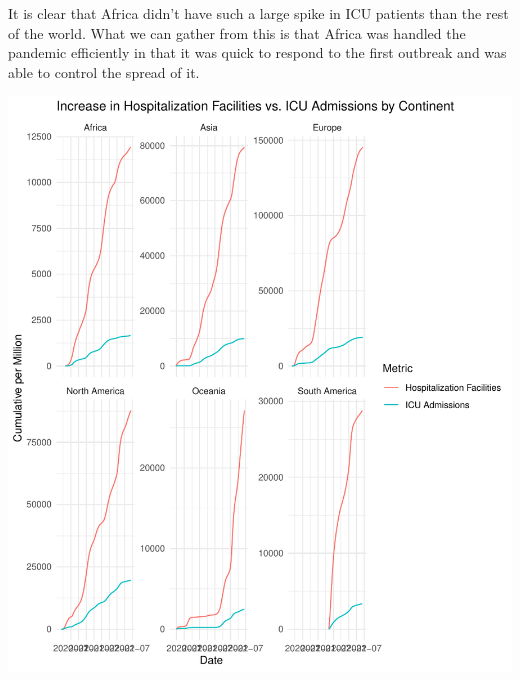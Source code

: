 \documentclass[12pt,preprint, authoryear]{elsarticle}
\let\origfigure\figure
\let\endorigfigure\endfigure
\renewenvironment{figure}[1][2] {
    \expandafter\origfigure\expandafter[H]
} {
    \endorigfigure
}
\numberwithin{equation}{section}
\numberwithin{figure}{section}
\numberwithin{table}{section}
\begin{document}
It is clear that Africa didn't have such a large spike in ICU patients
than the rest of the world. What we can gather from this is that Africa
was handled the pandemic efficiently in that it was quick to respond to
the first outbreak and was able to control the spread of it.

\begin{figure}[H]

{\centering \includegraphics{Q1_files/figure-latex/Figure5-1} 

}

\caption{Hospitalization VS ICU Admissions  \label{Figure5}}\label{fig:Figure5}
\end{figure}
\end{document}
